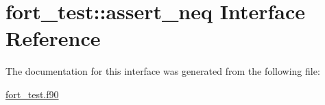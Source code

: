 \hypertarget{interfacefort__test_1_1assert__neq}{}\section{fort\+\_\+test\+:\+:assert\+\_\+neq Interface Reference}
\label{interfacefort__test_1_1assert__neq}


The documentation for this interface was generated from the following file\+:\begin{DoxyCompactItemize}
\item 
\hyperlink{fort__test_8f90}{fort\+\_\+test.\+f90}\end{DoxyCompactItemize}
